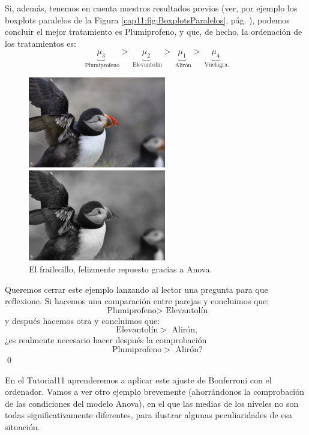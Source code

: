 \begin{ejemplo}
Si, además, tenemos en cuenta nuestros resultados previos (ver, por ejemplo los boxplots paralelos de la Figura \ref{cap11:fig:BoxplotsParalelos}, pág. \pageref{cap11:fig:BoxplotsParalelos}), podemos concluir el mejor tratamiento es { Plumiprofeno}, y que, de hecho, la ordenación de los tratamientos es:
\[
    \underbrace{\mu_3}_{\mbox{ Plumiprofeno}} >
    \underbrace{\mu_2}_{\mbox{ Elevantolín}} >
    \underbrace{\mu_1}_{\mbox{ Alirón}} >
    \underbrace{\mu_4}_{\mbox{ Vuelagra}.}
\]

\begin{figure}[h!]
\begin{center}
\begin{enColor}
\includegraphics[width=6cm]{../fig/Cap11-Frailecillo.png}
\end{enColor}
\begin{bn}
\includegraphics[width=6cm]{../fig/Cap11-Frailecillo-bn.png}
\end{bn}
\caption{El frailecillo, felizmente repuesto gracias a Anova.}
\label{cap11:fig:FrailecilloCurado}
\end{center}
\end{figure}
Queremos cerrar este ejemplo lanzando al lector una pregunta para que reflexione. Si hacemos una comparación entre parejas y concluimos que:
\[\mbox{ Plumiprofeno} > \mbox{ Elevantolín} \]
y después hacemos otra y concluimos que:
\[\mbox{ Elevantolín} > \mbox{ Alirón},\]
¿es realmente necesario hacer después la comprobación
\[\mbox{ Plumiprofeno} > \mbox{ Alirón}?\]
\qed
\end{ejemplo}

En el Tutorial11 aprenderemos a aplicar este ajuste de Bonferroni con el ordenador. Vamos a ver
otro ejemplo brevemente (ahorrándonos la comprobación de las condiciones del modelo Anova), en el que las medias de los niveles no son todas significativamente
diferentes, para ilustrar algunas peculiaridades de esa situación.

